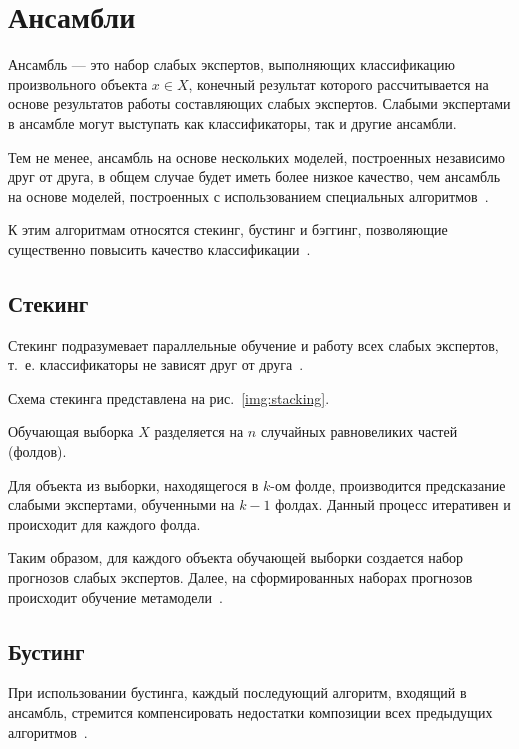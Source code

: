 \section{Ансамбли}

Ансамбль --- это набор слабых экспертов, выполняющих классификацию произвольного объекта $x \in X$, конечный результат которого рассчитывается на основе результатов работы составляющих слабых экспертов. Слабыми экспертами в ансамбле могут выступать как классификаторы, так и другие ансамбли.

Тем не менее, ансамбль на основе нескольких моделей, построенных независимо друг от друга, в общем случае будет иметь более низкое качество, чем ансамбль на основе моделей, построенных с использованием специальных алгоритмов~\cite{ensembles}.

К этим алгоритмам относятся стекинг, бустинг и бэггинг, позволяющие существенно повысить качество классификации~\cite{ensembles}.

\subsection{Стекинг}

Стекинг подразумевает параллельные обучение и работу всех слабых экспертов, т.~е. классификаторы не зависят друг от друга~\cite{ensembles}. 

Схема стекинга представлена на рис.~\ref{img:stacking}.


Обучающая выборка $X$ разделяется на $n$ случайных равновеликих частей (фолдов).

Для объекта из выборки, находящегося в $k$-ом фолде, производится предсказание слабыми экспертами, обученными на $k-1$ фолдах. Данный процесс итеративен и происходит для каждого фолда.

Таким образом, для каждого объекта обучающей выборки создается набор прогнозов слабых экспертов. Далее, на сформированных наборах прогнозов происходит обучение метамодели~\cite{ensembles}.

\subsection{Бустинг}

При использовании бустинга, каждый последующий алгоритм, входящий в ансамбль, стремится компенсировать недостатки композиции всех предыдущих алгоритмов~\cite{ensembles}.

